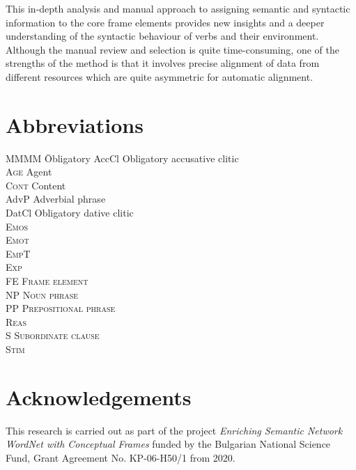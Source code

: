 \documentclass[output=paper,colorlinks,citecolor=brown]{langscibook}
\begin{document}
This in-depth analysis and manual approach to assigning semantic and syntactic information to the core frame elements provides new insights and a deeper understanding of the syntactic behaviour of verbs and their environment. Although the manual review and selection is quite time-consuming, one of the strengths of the method is that it involves precise alignment of data from different resources which are quite asymmetric for automatic alignment.


 

 
\section*{Abbreviations}
\begin{multicols}{2}
\begin{tabbing}
MMMM \= Obligatory\kill
 AccCl \> Obligatory accusative clitic \\
  \textsc{Age} \> Agent \\
  \textsc{Cont} \> Content\\
 AdvP \> Adverbial phrase \\
 DatCl \> Obligatory dative clitic \\
\scshape Emos \> \\
\scshape Emot \> \\
\scshape EmpT \> \\
\scshape Exp \> \\
 FE \> Frame element  \\
 NP \> Noun phrase \\
 PP \> Prepositional phrase \\
\scshape Reas \> \\
 S \> Subordinate clause \\
\scshape Stim \> \\
\end{tabbing}
\end{multicols}




\section*{Acknowledgements}

This research is carried out as part of the project \emph{Enriching Semantic Network WordNet with Conceptual Frames} funded by the Bulgarian National Science Fund, Grant Agreement No. KP-06-H50/1 from 2020.



{\sloppy\printbibliography[heading=subbibliography,notkeyword=this]}
\end{document}
